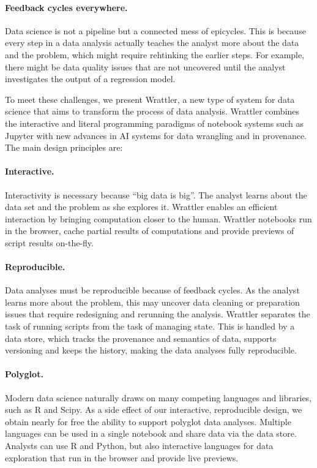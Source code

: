 \documentclass[sigplan,preprint,10pt]{acmart}\settopmatter{printfolios=true,printccs=false,printacmref=false}
\begin{document}
\paragraph{Feedback cycles everywhere.} Data science is
not a pipeline but a connected mess of epicycles. This is because every step
in a data analysis actually teaches
the analyst more about the data and the problem, which might require rehtinking the earlier steps.
For example, there might be data quality issues that
are not uncovered until the analyst
investigates the output of a regression model.

\vspace{1em}
\noindent
To meet these challenges, we present Wrattler,
a new type of system for data science
that aims to transform the process
of data analysis.
Wrattler combines the interactive and literal programming paradigms
of notebook systems such as Jupyter
with new advances in AI systems for data wrangling and in provenance.
The main design principles are:

\paragraph{Interactive.} Interactivity
is necessary because ``big data is big''. The analyst learns about
the data set and the problem as she explores it.
Wrattler enables an efficient interaction by bringing computation closer to the human.
Wrattler notebooks run in the browser, cache partial results of computations and provide previews
of script results on-the-fly.

\paragraph{Reproducible.}
Data analyses must be reproducible
because of feedback cycles. As the
analyst learns more about the problem,
this may uncover data cleaning or preparation issues that require
redesigning and rerunning the analysis.
Wrattler separates the task of running scripts from the task of managing state.
This is handled by a data store, which tracks the provenance and semantics of data, supports
versioning and keeps the history, making the data analyses fully reproducible.

\paragraph{Polyglot.}
Modern data science naturally draws
on many competing languages and libraries, such as R and Scipy. As a side effect
of our interactive, reproducible design,
we obtain nearly for free the ability
to support polyglot data analyses.
Multiple languages can be used in a single notebook and share data via the data store.
Analysts can use R and Python, but also interactive languages for data exploration
that run in the browser and provide live previews.
\end{document}
